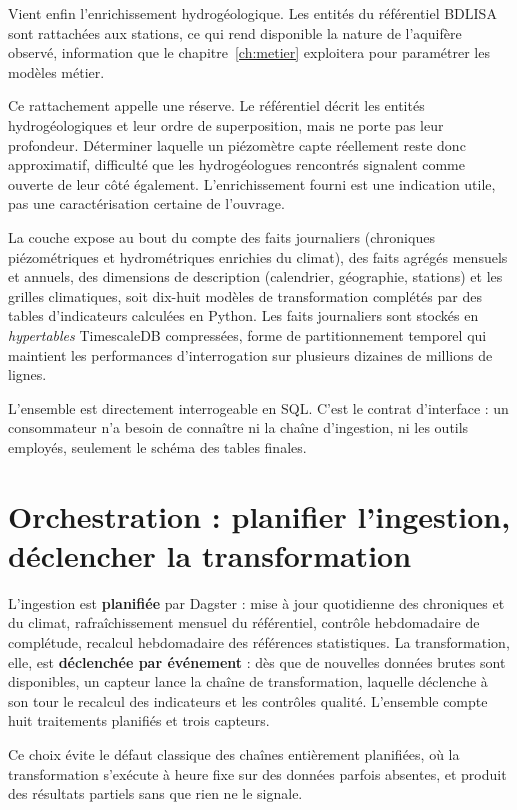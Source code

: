 Vient enfin l'enrichissement hydrogéologique. Les entités du référentiel BDLISA sont rattachées
aux stations, ce qui rend disponible la nature de l'aquifère observé, information que le
chapitre~\ref{ch:metier} exploitera pour paramétrer les modèles métier.

Ce rattachement appelle une réserve. Le référentiel décrit les entités hydrogéologiques et leur
ordre de superposition, mais ne porte pas leur profondeur. Déterminer laquelle un piézomètre
capte réellement reste donc approximatif, difficulté que les hydrogéologues rencontrés signalent
comme ouverte de leur côté également. L'enrichissement fourni est une indication utile, pas une
caractérisation certaine de l'ouvrage.

La couche expose au bout du compte des faits journaliers (chroniques
piézométriques et hydrométriques enrichies du climat), des faits agrégés mensuels et annuels,
des dimensions de description (calendrier, géographie, stations) et les grilles climatiques,
soit dix-huit modèles de transformation complétés par des tables d'indicateurs calculées en
Python. Les faits journaliers sont stockés en \emph{hypertables} TimescaleDB compressées,
forme de partitionnement temporel qui maintient les performances d'interrogation sur plusieurs
dizaines de millions de lignes.

L'ensemble est directement interrogeable en SQL. C'est le contrat d'interface : un consommateur
n'a besoin de connaître ni la chaîne d'ingestion, ni les outils employés, seulement le schéma
des tables finales.

\section{Orchestration : planifier l'ingestion, déclencher la transformation}

L'ingestion est \textbf{planifiée} par Dagster : mise à jour quotidienne des chroniques et du
climat, rafraîchissement mensuel du référentiel, contrôle hebdomadaire de complétude, recalcul
hebdomadaire des références statistiques. La transformation, elle, est \textbf{déclenchée par
événement} : dès que de nouvelles données brutes sont disponibles, un capteur lance la chaîne de
transformation, laquelle déclenche à son tour le recalcul des indicateurs et les contrôles
qualité. L'ensemble compte huit traitements planifiés et trois capteurs.

Ce choix évite le défaut classique des chaînes entièrement planifiées, où la transformation
s'exécute à heure fixe sur des données parfois absentes, et produit des résultats partiels sans
que rien ne le signale.


